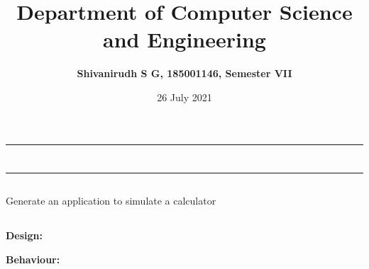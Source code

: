 \documentclass[12pt,letterpaper]{article}
\title{\textbf{Department of Computer Science and Engineering}}
\author{\textbf{Shivanirudh S G, 185001146, Semester VII }}
\date{26 July 2021}
\begin{document}
\maketitle
\hrule
\section*{}
\hrule 
\bigskip\bigskip

\subsection*{}

\subsection*{}
\begin{flushleft}
    Generate an application to simulate a calculator   
\end{flushleft}

\subsection*{}
\subsubsection*{}
\textbf{Design:}
\begin{flushleft}

\end{flushleft}
\textbf{Behaviour:}
\begin{flushleft}

\end{flushleft}

\newpage
\end{document}
